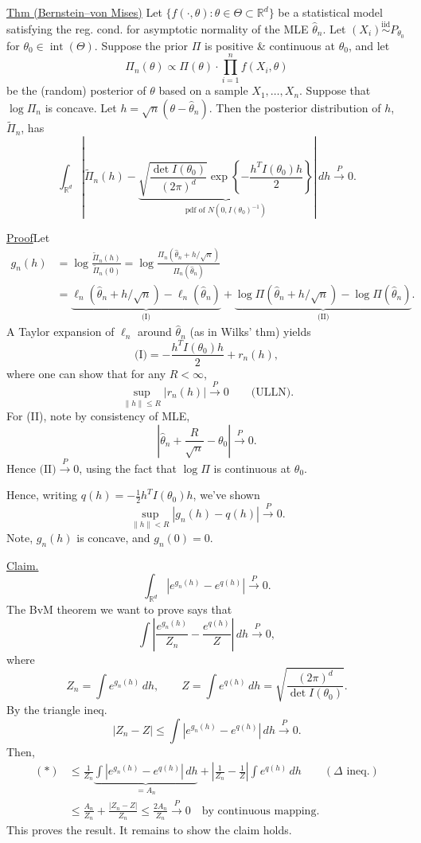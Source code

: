 \documentclass[11pt,a4paper]{article}
\begin{document}
\medskip
\noindent\underline{Thm (Bernstein--von Mises)}\quad
Let $\{f(\cdot,\theta):\theta\in\Theta\subset\mathbb R^d\}$ be a statistical
model satisfying the reg. cond. for asymptotic normality of the MLE
$\hat\theta_n$. Let $(X_i)\overset{\mathrm{iid}}{\sim}P_{\theta_0}$ for
$\theta_0\in\operatorname{int}(\Theta)$.
Suppose the prior $\Pi$ is positive \& continuous at $\theta_0$, and let
\[
\Pi_n(\theta)\propto\Pi(\theta)\cdot\prod_{i=1}^n f(X_i,\theta)
\]
be the (random) posterior of $\theta$ based on a sample $X_1,\ldots,X_n$.
Suppose that $\log\Pi_n$ is concave. Let $h=\sqrt n(\theta-\hat\theta_n)$.
Then the posterior distribution of $h$, $\widetilde\Pi_n$, has
\[
\int_{\mathbb R^d}\left|
\widetilde\Pi_n(h)-
\underbrace{\sqrt{\frac{\det I(\theta_0)}{(2\pi)^d}}
\exp\left\{-\frac{h^T I(\theta_0)h}{2}\right\}}
_{\text{pdf of }N(0,I(\theta_0)^{-1})}
\right|\,dh\xrightarrow{P}0.
\]

\medskip
\noindent\underline{Proof}\quad Let
\[
\begin{aligned}
g_n(h)
&=\log\frac{\widetilde\Pi_n(h)}{\widetilde\Pi_n(0)}
=\log\frac{\Pi_n(\hat\theta_n+h/\sqrt n)}{\Pi_n(\hat\theta_n)}\\
&=\underbrace{\ell_n(\hat\theta_n+h/\sqrt n)-\ell_n(\hat\theta_n)}_{\text{(I)}}
+\underbrace{\log\Pi(\hat\theta_n+h/\sqrt n)-\log\Pi(\hat\theta_n)}_{\text{(II)}}.
\end{aligned}
\]
A Taylor expansion of $\ell_n$ around $\hat\theta_n$ (as in Wilks' thm) yields
\[
\text{(I)}=-\frac{h^T I(\theta_0)h}{2}+r_n(h),
\]
where one can show that for any $R<\infty$,
\[
\sup_{\|h\|\leq R}|r_n(h)|\xrightarrow{P}0\qquad\text{(ULLN)}.
\]
For (II), note by consistency of MLE,
\[
\left|\hat\theta_n+\frac{R}{\sqrt n}-\theta_0\right|\xrightarrow{P}0.
\]
Hence $\text{(II)}\xrightarrow{P}0$, using the fact that $\log\Pi$ is
continuous at $\theta_0$.

Hence, writing $q(h)=-\frac12h^T I(\theta_0)h$, we've shown
\[
\sup_{\|h\|<R}|g_n(h)-q(h)|\xrightarrow{P}0.
\]
Note, $g_n(h)$ is concave, and $g_n(0)=0$.

\medskip
\noindent\underline{Claim.}
\[
\int_{\mathbb R^d}\left|e^{g_n(h)}-e^{q(h)}\right|\xrightarrow{P}0.
\]
The BvM theorem we want to prove says that
\[
\int\left|\frac{e^{g_n(h)}}{Z_n}-\frac{e^{q(h)}}{Z}\right|\,dh
\xrightarrow{P}0,
\]
where
\[
Z_n=\int e^{g_n(h)}\,dh,\qquad
Z=\int e^{q(h)}\,dh=\sqrt{\frac{(2\pi)^d}{\det I(\theta_0)}}.
\]
By the triangle ineq.
\[
|Z_n-Z|\leq\int\left|e^{g_n(h)}-e^{q(h)}\right|\,dh\xrightarrow{P}0.
\]
Then,
\[
\begin{aligned}
(*)&\leq\frac1{Z_n}
\underbrace{\int\left|e^{g_n(h)}-e^{q(h)}\right|\,dh}_{=A_n}
+\left|\frac1{Z_n}-\frac1Z\right|\int e^{q(h)}\,dh
\qquad(\Delta\text{ ineq.})\\
&\leq\frac{A_n}{Z_n}+\frac{|Z_n-Z|}{Z_n}
\leq\frac{2A_n}{Z_n}\xrightarrow{P}0
\quad\text{by continuous mapping}.
\end{aligned}
\]
This proves the result. It remains to show the claim holds.
\end{document}
